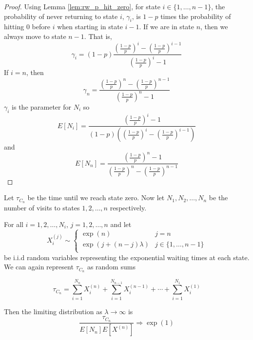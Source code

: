 \begin{proof}
Using Lemma \ref{lem:rw_p_hit_zero}, for state $i \in \{1, \ldots, n - 1\}$, the probability of never returning to state $i$, $\gamma_i$, is $1 - p$ times the probability of hitting 0 before $i$ when starting in state $i - 1$.
If we are in state $n$, then we always move to state $n - 1$. That is,
$$
\gamma_i = (1 - p) \frac{
        \left( \frac{1 - p}{p} \right)^{i} - \left( \frac{1 - p}{p} \right)^{i - 1}
    }{
        \left( \frac{1 - p}{p} \right)^{i} - 1
    }
$$
If $i = n$, then
$$
\gamma_n = \frac{
        \left( \frac{1 - p}{p} \right)^{n} - \left( \frac{1 - p}{p} \right)^{n - 1}
    }{
        \left( \frac{1 - p}{p} \right)^{n} - 1
    }
$$
$\gamma_i$ is the parameter for $N_i$ so
$$
E[N_i] = \frac{
        \left( \frac{1 - p}{p} \right)^{i} - 1
    }{
        (1 - p) \left( \left( \frac{1 - p}{p} \right)^{i} - \left( \frac{1 - p}{p} \right)^{i - 1}\right)
    }
$$
and
$$
E[N_n] = \frac{
        \left( \frac{1 - p}{p} \right)^{n} - 1
    }{
        \left( \frac{1 - p}{p} \right)^{n} - \left( \frac{1 - p}{p} \right)^{n - 1}
    }
$$
\end{proof}

\begin{theorem}
Let $\tau_{C_n}$ be the time until we reach state zero.
Now let $N_1, N_2, \ldots, N_n$ be the number of visits to states $1, 2, \ldots, n$ respectively.

For all $i = 1,2,\ldots, N_i$, $j = 1,2,\ldots, n$ and let
$$
X_i^{(j)} \sim \begin{cases}
  \exp\left( n \right) & j = n\\
  \exp\left( j + (n - j)\lambda \right) & j \in \{1,\ldots, n - 1\}\\
\end{cases}
$$
be i.i.d random variables representing the exponential waiting times at each state.
We can again represent $\tau_{C_n}$ as random sums

\begin{equation}\label{eq:wait_contact_sum}
    \tau_{C_n} = \sum_{i = 1}^{N_n} X_i^{(n)} + \sum_{i = 1}^{N_{n - 1}} X_i^{(n - 1)} + \cdots + \sum_{i = 1}^{N_1} X_i^{(1)}
\end{equation}

Then the limiting distribution as $\lambda \to \infty$ is
$$
\frac{\tau_{C_n}}{E[N_{n}]E[X^{(n)}]} \Rightarrow \exp(1)
$$
\end{theorem}

